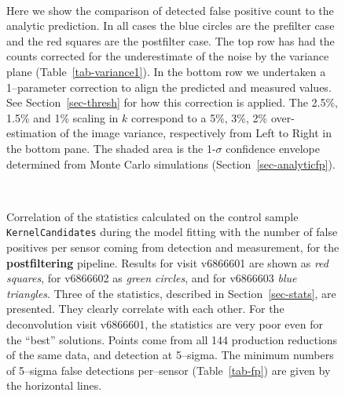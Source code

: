 \documentclass[prd, nofootinbib, floatfix, 11pt,tightenlines,times]{article}
\begin{document}
\begin{figure}%
\captionsetup[subfloat]{labelformat=empty}
\centering
{}
\\
%
%
%
\caption{Here we show the comparison of detected false positive count to the analytic prediction.
In all cases the blue circles are the prefilter case and the red squares are the postfilter case.  
The top row has had the counts corrected for the underestimate of the noise by the variance plane (Table~\ref{tab-variance1}).  
In the bottom row we undertaken a 1--parameter correction to align the predicted and measured values.  See Section~\ref{sec-thresh}
for how this correction is applied.  The 2.5\%, 1.5\% and 1\% scaling in $k$ correspond to a 5\%, 3\%, 2\% over-estimation of the image variance, respectively
from Left to Right in the bottom pane.  
The shaded area is the 1-$\sigma$ confidence envelope
determined from Monte Carlo simulations (Section~\ref{sec-analyticfp}).}
\label{fig-fp_v_thresh}
\end{figure}


\begin{figure}
 \\
\caption{Correlation of the statistics calculated on the control
  sample {\tt KernelCandidates} during the model fitting with the
  number of false positives per sensor coming from
  detection and measurement, for the {\bf postfiltering} pipeline.
  Results for visit v6866601 are shown as {\it red squares}, for
  v6866602 as {\it green circles}, and for v6866603 {\it blue
    triangles}.  Three of the statistics, described in
  Section~\ref{sec-stats}, are presented.  They clearly correlate with
  each other.  For the deconvolution visit v6866601, the statistics
  are very poor even for the ``best'' solutions.  Points come from 
  all 144 production reductions of the same data, and detection at 5--sigma.
  The minimum numbers of 5--sigma false detections per--sensor (Table~\ref{tab-fp})
  are given by the horizontal lines.
}
\label{corrpost}
\end{figure}
\end{document}
